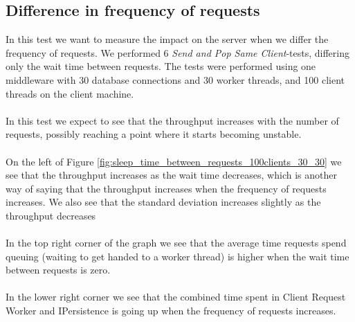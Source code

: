 \documentclass{article}
\begin{document}
        \subsection{Difference in frequency of requests}
            \label{sec:difference_in_frequency_of_requests}
            In this test we want to measure the impact on the server when we differ the frequency of requests. We performed 6 \textit{Send and Pop Same Client}-tests, differing only the wait time between requests. The tests were performed using one middleware with 30 database connections and 30 worker threads, and 100 client threads on the client machine.\\
            \\
            In this test we expect to see that the throughput increases with the number of requests, possibly reaching a point where it starts becoming unstable.\\
            \\
            On the left of Figure \ref{fig:sleep_time_between_requests_100clients_30_30} we see that the throughput increases as the wait time decreases, which is another way of saying that the throughput increases when the frequency of requests increases. We also see that the standard deviation increases slightly as the throughput decreases\\
            \\
            In the top right corner of the graph we see that the average time requests spend queuing (waiting to get handed to a worker thread) is higher when the wait time between requests is zero.\\
            \\
            In the lower right corner we see that the combined time spent in Client Request Worker and IPersistence is going up when the frequency of requests increases.
\end{document}
